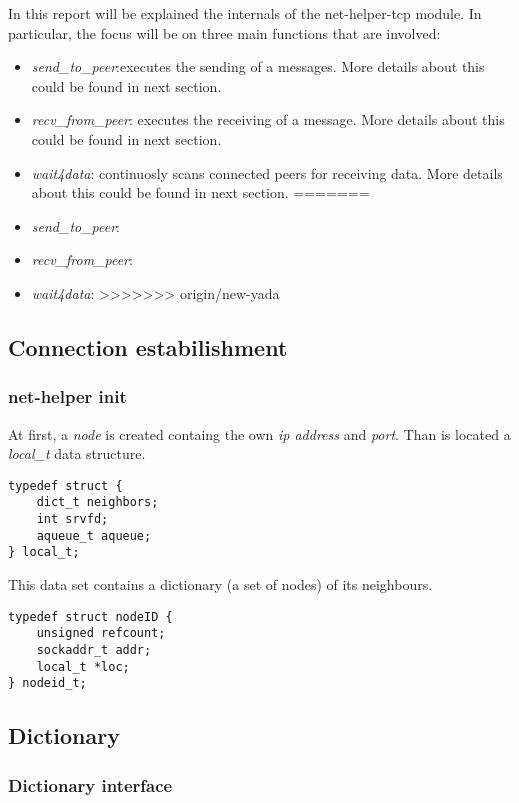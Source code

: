 In this report will be explained the internals of the net-helper-tcp module.
In particular, the focus will be on three main functions that are involved:
\begin{itemize}
<<<<<<< HEAD
  \item \textit{send\_to\_peer}:executes the sending of a messages. More details about
    this could be found in next section.
  \item \textit{recv\_from\_peer}: executes the receiving of a message. More details about
    this could be found in next section.
  \item \textit{wait4data}:  continuosly scans connected peers for receiving data.
    More details about this could be found in next section.
=======
  \item \textit{send\_to\_peer}:
  \item \textit{recv\_from\_peer}:
  \item \textit{wait4data}:
>>>>>>> origin/new-yada
\end{itemize}


\subsection{Connection estabilishment}

\subsubsection{net-helper init}
At first, a \textit{node} is created containg the own \textit{ip address} and \textit{port}. Than is located a
\textit{local\_t} data structure.
\begin{lstlisting}
typedef struct {
    dict_t neighbors;
    int srvfd;
    aqueue_t aqueue;
} local_t;
\end{lstlisting}
This data set contains a dictionary (a set of nodes) of its neighbours. 

\begin{lstlisting}
typedef struct nodeID {
    unsigned refcount;
    sockaddr_t addr;
    local_t *loc;
} nodeid_t;
\end{lstlisting}

\subsection{Dictionary}


\subsubsection{Dictionary interface}


